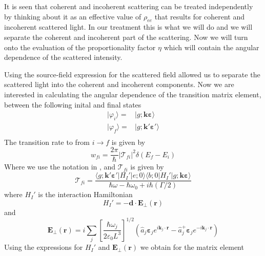 \documentclass[11pt,letter]{article}
\newcommand{\bv}[1]{\ensuremath{\bm{#1}}}
\begin{document}
It is seen that coherent and incoherent scattering can be treated independently by thinking about it as an effective value of $\rho_{ee}$ that results for coherent and incoherent scattered light.  In our treatment this is what we will do and we will separate the coherent and incoherent part of the scattering.   Now we will turn onto the evaluation of the proportionality factor $\eta$ which will contain the angular dependence of the scattered intensity.  


Using the source-field expression for the scattered field allowed us to separate the scattered light into the coherent and incoherent components.  Now we are interested in calculating the angular dependence of the transition matrix element, between the following inital and final states
\begin{equation}
\begin{split}
    | \varphi_{i} \rangle = & | g ; \bv{k}\bv{\varepsilon} \rangle \\
    | \varphi_{f} \rangle = & | g ; \bv{k}'\bv{\varepsilon}' \rangle \\
\end{split}
\end{equation} 
The transition rate to from $i\rightarrow f$ is given by 
\begin{equation}
    \label{eq:transitionRate}
    w_{fi} = \frac{2\pi}{\hbar} | \mathcal{T}_{fi} |^{2} \delta(E_{f}-E_{i})
\end{equation}
Where we use the notation in \cite{cohen1998atom}, and $\mathcal{T}_{fi}$ is given by
\begin{equation}
    \mathcal{T}_{fi} = \frac{  
        \langle g; \bv{k}'\bv{\varepsilon}'| H_{I}' | e; 0 \rangle 
        \langle b; 0 | H_{I}' | g; \bv{k}\bv{\varepsilon} \rangle }
        { \hbar\omega - \hbar\omega_{0} + i\hbar (\Gamma/2 ) }
\end{equation} 
where $H_{I}'$ is the interaction Hamiltonian
\begin{equation}
    H_{I}' = -\bv{d} \cdot \bv{E}_{\perp} ( \bv{r} ) 
\end{equation}
and
\begin{equation}
    \bv{E}_{\perp}(\bv{r}) = i \sum_{j} 
        \left[ \frac{ \hbar \omega_{j} }{ 2\varepsilon_{0} L^{3}}  \right]^{1/2}
        \left( \hat{a}_{j}\bv{\varepsilon}_{j} e^{i\bv{k}_{j}\cdot\bv{r}} 
              - \hat{a}_{j}^{+}\bv{\varepsilon}_{j} e^{-i\bv{k}_{j}\cdot\bv{r}} 
        \right)
\end{equation}
Using the expressions for $H_{I}'$ and $\bv{E}_{\perp}(\bv{r})$ we obtain for the matrix element 
\end{document}
